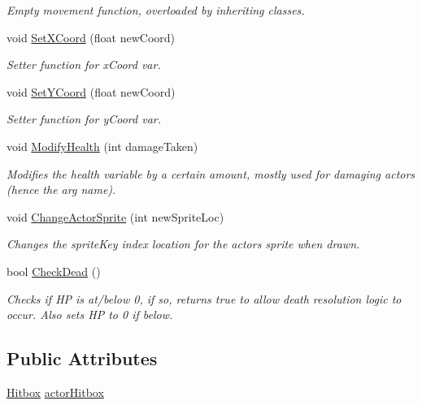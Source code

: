 \begin{DoxyCompactItemize}
\begin{DoxyCompactList}\small\item\em Empty movement function, overloaded by inheriting classes. \end{DoxyCompactList}\item 
void \hyperlink{class_actor_a854aad969c3695d08f335c41f0675ad7}{Set\+X\+Coord} (float new\+Coord)
\begin{DoxyCompactList}\small\item\em Setter function for x\+Coord var. \end{DoxyCompactList}\item 
void \hyperlink{class_actor_aae6e98635555c88a9e19fa1459462f79}{Set\+Y\+Coord} (float new\+Coord)
\begin{DoxyCompactList}\small\item\em Setter function for y\+Coord var. \end{DoxyCompactList}\item 
void \hyperlink{class_actor_a99ae0d6870270e5d9328d7ea4f62c685}{Modify\+Health} (int damage\+Taken)
\begin{DoxyCompactList}\small\item\em Modifies the health variable by a certain amount, mostly used for damaging actors (hence the arg name). \end{DoxyCompactList}\item 
void \hyperlink{class_actor_a7d72c85e4766782f14b7ccf98a1ac503}{Change\+Actor\+Sprite} (int new\+Sprite\+Loc)
\begin{DoxyCompactList}\small\item\em Changes the sprite\+Key index location for the actor\textquotesingle{}s sprite when drawn. \end{DoxyCompactList}\item 
bool \hyperlink{class_actor_af23f6712ddbe46073dfa17918654a21c}{Check\+Dead} ()
\begin{DoxyCompactList}\small\item\em Checks if HP is at/below 0, if so, returns true to allow death resolution logic to occur. Also sets HP to 0 if below. \end{DoxyCompactList}\end{DoxyCompactItemize}
\subsection*{Public Attributes}
\begin{DoxyCompactItemize}
\item 
\hyperlink{class_hitbox}{Hitbox} \hyperlink{class_actor_a3350262199757df220cd955166368ce5}{actor\+Hitbox}
\end{DoxyCompactItemize}
